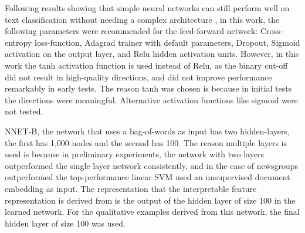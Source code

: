 Following results showing that simple neural networks can still perform well on text classification without needing a complex architecture  \cite{Lakhotia2018} \cite{Nam2014}, in this work, the following parameters were recommended for the feed-forward network: Cross-entropy loss-function, Adagrad trainer with default parameters, Dropout, Sigmoid activation on the output layer, and Relu hidden activation units. However, in this work the tanh activation function is used instead of Relu, as the binary cut-off  did not result in high-quality directions, and did not improve performance remarkably in early tests. The reason tanh was chosen is because in initial tests the directions were meaningful. Alternative activation functions  like sigmoid were not tested. %



NNET-B, the network that uses a   bag-of-words as input has  two hidden-layers, the first has  1,000 nodes and the second has 100. The reason multiple layers is used is because in preliminary experiments, the network with two layers outperformed the single layer network consistently, and in the case of newsgroups outperformed the top-performance linear SVM  used an unsupervised document embedding as input. The representation that the interpretable feature representation is derived from is the output of the hidden layer of size 100 in the learned network. For the qualitative examples derived from this network,  the final hidden layer of size 100 was used.

